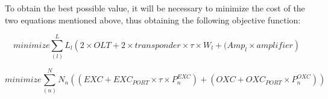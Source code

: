 To obtain the best possible value, it will be necessary to minimize the cost of the two equations mentioned above, thus obtaining the following objective function:

\begin{equation}
minimize
\sum_{(l)}^L L_{l} \left(2 \times OLT + 2 \times transponder \times \tau \times W_{l} + ( Amp_{l} \times amplifier \right)
\label{obj_func}
\end{equation}

\begin{equation}
minimize
\sum_{(n)}^N N_{n} ( \left(EXC + EXC_{PORT} \times \tau \times P^{EXC}_{n} \right) + \left(OXC + OXC_{PORT} \times P^{OXC}_{n} \right) )
\label{obj_func1}
\end{equation}


